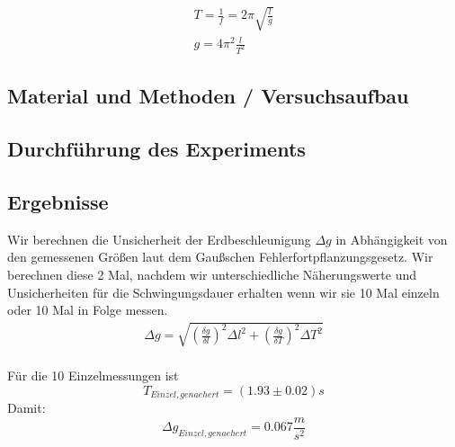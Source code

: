 \documentclass{article}
\begin{document}
\begin{align}
T=\frac{1}{f}=2 \pi\sqrt{\frac{l}{g}} \\
g=4\pi^2\frac{l}{T^2}
\end{align}
\subsection{Material und Methoden / Versuchsaufbau}

\subsection{Durchführung des Experiments}

\subsection{Ergebnisse}
Wir berechnen die Unsicherheit der Erdbeschleunigung $\Delta g$ in Abhängigkeit von den gemessenen Größen laut dem Gaußschen Fehlerfortpflanzungsgesetz. Wir berechnen diese 2 Mal, nachdem wir unterschiedliche Näherungswerte und Unsicherheiten für die Schwingungsdauer erhalten wenn wir sie 10 Mal einzeln oder 10 Mal in Folge messen.
\begin{align}
\Delta g=\sqrt{(\frac{\delta g}{\delta l})^2\Delta l^2 + (\frac{\delta g}{\delta T})^2\Delta T^2}
\end{align} \\
Für die 10 Einzelmessungen ist
\begin{equation}
T_{Einzel,genaehert} = (1.93 \pm 0.02)s
\end{equation}
Damit:
\begin{equation}
\Delta g_{Einzel,genaehert} = 0.067 \frac{m}{s^2}
\end{equation}
\end{document}
